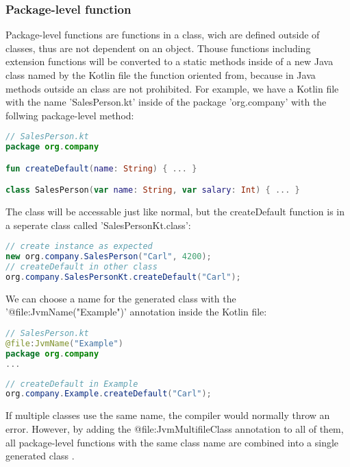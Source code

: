 \documentclass[a4paper,11pt]{article}
\begin{document}
\subsubsection{Package-level function}
Package-level functions are functions in a class, wich are defined outside of classes, thus are not dependent on an object. Thouse functions including extension functions will be converted to a static methods inside of a new Java class \cite{interop-package-level-func} named by the Kotlin file the function oriented from, because in Java methods outside an class are not prohibited. For example, we have a Kotlin file with the name 'SalesPerson.kt' inside of the package 'org.company' with the follwing package-level method:
\begin{lstlisting}[language=Kotlin]
// SalesPerson.kt
package org.company

fun createDefault(name: String) { ... }

class SalesPerson(var name: String, var salary: Int) { ... }
\end{lstlisting}
The class will be accessable just like normal, but the createDefault function is in a seperate class called 'SalesPersonKt.class':
\begin{lstlisting}[language=Java]
// create instance as expected
new org.company.SalesPerson("Carl", 4200);
// createDefault in other class
org.company.SalesPersonKt.createDefault("Carl");
\end{lstlisting}
We can choose a name for the generated class with the '@file:JvmName("Example")' annotation inside the Kotlin file:
\begin{lstlisting}[language=Kotlin]
// SalesPerson.kt
@file:JvmName("Example")
package org.company
...
\end{lstlisting}
\begin{lstlisting}[language=Java]
// createDefault in Example
org.company.Example.createDefault("Carl");
\end{lstlisting}
If multiple classes use the same name, the compiler would normally throw an error. However, by adding the @file:JvmMultifileClass annotation to all of them, all package-level functions with the same class name are combined into a single generated class \cite{interop-package-level-func}.
\end{document}
